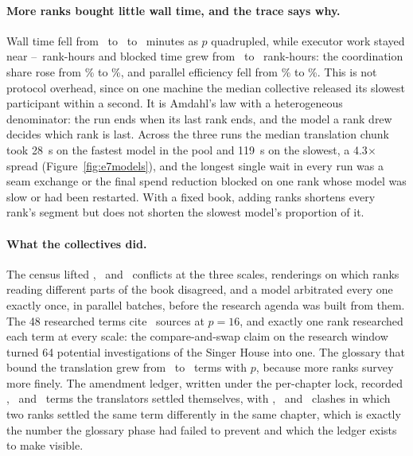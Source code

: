 \paragraph{More ranks bought little wall time, and the trace says why.} Wall
time fell from \eSevenWallSixteen\ to \eSevenWallThirtytwo\ to
\eSevenWallSixtyfour\ minutes as $p$ quadrupled, while executor work stayed near
\eSevenWorkHSixteen--\eSevenWorkHSixtyfour\ rank-hours and blocked time grew
from \eSevenBlockedHSixteen\ to \eSevenBlockedHSixtyfour\ rank-hours: the
coordination share rose from \eSevenCoordShareSixteen\% to
\eSevenCoordShareSixtyfour\%, and parallel efficiency fell from
\eSevenEfficiencySixteen\% to \eSevenEfficiencySixtyfour\%. This is not
protocol overhead, since on one machine the median collective released its
slowest participant within a second. It is Amdahl's law with a heterogeneous
denominator: the run ends when its last rank ends, and the model a rank drew
decides which rank is last. Across the three runs the median translation chunk
took 28~s on the fastest model in the pool and 119~s on the slowest, a
4.3$\times$ spread (Figure~\ref{fig:e7models}), and the longest single wait in
every run was a seam exchange or the final spend reduction blocked on one rank
whose model was slow or had been restarted. With a fixed book, adding ranks
shortens every rank's segment but does not shorten the slowest model's
proportion of it.

\paragraph{What the collectives did.} The census lifted
\eSevenConflictsSixteen, \eSevenConflictsThirtytwo\ and
\eSevenConflictsSixtyfour\ conflicts at the three scales, renderings on which
ranks reading different parts of the book disagreed, and a model arbitrated
every one exactly once, in parallel batches, before the research agenda was
built from them. The 48 researched terms cite \eSevenSourcesSixteen\ sources at
$p=16$, and exactly one rank researched each term at every scale: the
compare-and-swap claim on the research window turned 64 potential
investigations of the Singer House into one. The glossary that bound the
translation grew from \eSevenGlossarySixteen\ to \eSevenGlossarySixtyfour\
terms with $p$, because more ranks survey more finely. The amendment ledger,
written under the per-chapter lock, recorded \eSevenAmendmentsSixteen,
\eSevenAmendmentsThirtytwo\ and \eSevenAmendmentsSixtyfour\ terms the
translators settled themselves, with \eSevenClashesSixteen,
\eSevenClashesThirtytwo\ and \eSevenClashesSixtyfour\ clashes in which two ranks
settled the same term differently in the same chapter, which is exactly the
number the glossary phase had failed to prevent and which the ledger exists to
make visible.

